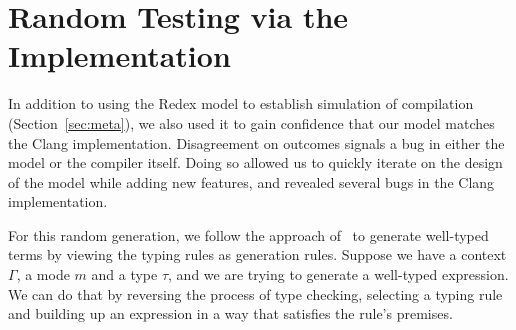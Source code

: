 \section{Random Testing via the Implementation}\label{sec:evaluation}


In addition to using the \lang Redex model to establish simulation of
compilation (Section~\ref{sec:meta}), we also used it to gain confidence
that our model matches the Clang \checkedc implementation.
Disagreement on outcomes signals a bug in either the model or the
compiler itself. Doing so allowed us to quickly iterate on the
design of the model while adding new features, and revealed
several bugs in the Clang \checkedc implementation.

 For this random generation, we follow
the approach of~\citet{PalkaAST11} to generate well-typed \checkedc
terms by viewing the typing rules as generation rules.
%
Suppose we have a context $\Gamma$, a mode
$m$ and a type $\tau$, and we are
trying to generate a well-typed expression. We can do that by
reversing the process of type checking, selecting a typing rule and
building up an expression in a way that satisfies the rule's premises.

